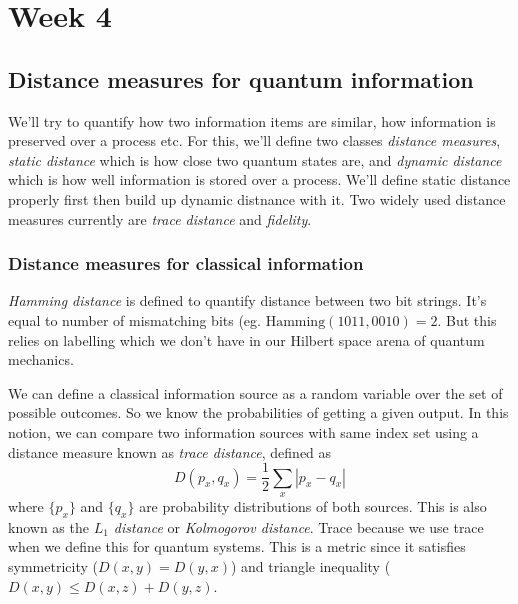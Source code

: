 \part{Week 4}
\chapter{Distance measures for quantum information}
We'll try to quantify how two information items are similar, how information is preserved over a process etc. For this, we'll define two classes \textit{distance measures}, \textit{static distance} which is how close two quantum states are, and \textit{dynamic distance} which is how well information is stored over a process. We'll define static distance properly first then build up dynamic distnance with it. Two widely used distance measures currently are \textit{trace distance} and \textit{fidelity}.

\section{Distance measures for classical information}
\textit{Hamming distance} is defined to quantify distance between two bit strings. It's equal to number of mismatching bits (eg. $\text{Hamming}(1011,0010)=2$. But this relies on labelling which we don't have in our Hilbert space arena of quantum mechanics.

We can define a classical information source as a random variable over the set of possible outcomes. So we know the probabilities of getting a given output. In this notion, we can compare two information sources with same index set using a distance measure known as \textit{trace distance}, defined as
\begin{equation}
    D(p_x, q_x) = \frac{1}{2}\sum_x |p_x-q_x|
\end{equation}
where $\{ p_x \}$ and $\{ q_x \}$ are probability distributions of both sources. This is also known as the \textit{$L_1$ distance} or \textit{Kolmogorov distance}. Trace because we use trace when we define this for quantum systems. This is a metric since it satisfies symmetricity ($D(x,y)=D(y,x)$) and triangle inequality ($D(x,y)\leq D(x,z)+D(y,z)$.

